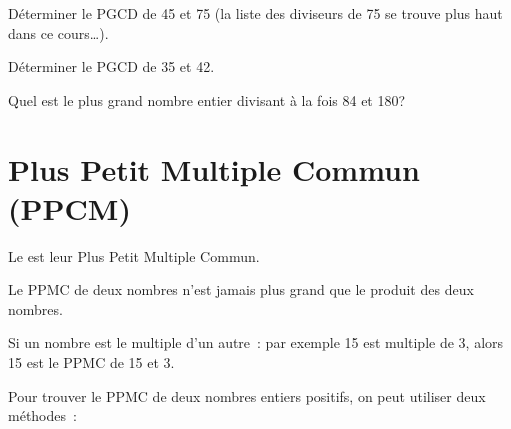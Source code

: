 \begin{methode*1}
\exercice  
Déterminer le PGCD de 45 et 75 (la liste des diviseurs de 75 se trouve plus haut dans ce cours…).

\vspace{3em}

\exercice  
Déterminer le PGCD de 35 et 42.

\vspace{5em}

\exercice  
Quel est le plus grand nombre entier divisant à la fois 84 et 180?

\vspace{3em}

 \end{methode*1}
 
 
 \newpage
 
 \section{Plus Petit Multiple Commun (PPCM)}
 
\begin{definition}
Le  est leur Plus Petit Multiple Commun.
\end{definition}

 \begin{remarque}
Le PPMC de deux nombres n'est jamais plus grand que le produit des deux nombres.

Si un nombre est le multiple d'un autre : par exemple 15 est multiple de 3, alors 15 est le PPMC de 15 et 3.
 \end{remarque}
 
 \vspace{2em}
 
 Pour trouver le PPMC de deux nombres entiers positifs, on peut utiliser deux méthodes :  \\[1em]



